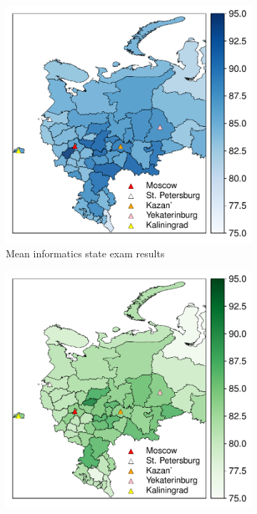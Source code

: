 \documentclass{article}
\begin{document}
\begin{figure}[t!]
  \centering
  \begin{subfigure}{0.49\textwidth}
    \includegraphics[width=\linewidth]{../gfx/map_informatics.pdf}
    \caption{Mean informatics state exam results}
    \label{fig:mapinf}
  \end{subfigure}
  \begin{subfigure}{0.49\textwidth}
    \includegraphics[width=\linewidth]{../gfx/map_math.pdf}

\end{subfigure}
\end{figure}
\end{document}
